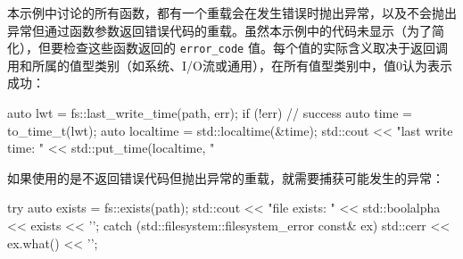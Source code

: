 本示例中讨论的所有函数，都有一个重载会在发生错误时抛出异常，以及不会抛出异常但通过函数参数返回错误代码的重载。虽然本示例中的代码未显示（为了简化），但要检查这些函数返回的 \verb|error_code| 值。每个值的实际含义取决于返回调用和所属的值型类别（如系统、I/O流或通用），在所有值型类别中，值0认为表示成功：

\begin{cpp}
auto lwt = fs::last_write_time(path, err);
if (!err) // success
{
    auto time = to_time_t(lwt);
    auto localtime = std::localtime(&time);
    std::cout << "last write time: "
              << std::put_time(localtime, "%
}
\end{cpp}

如果使用的是不返回错误代码但抛出异常的重载，就需要捕获可能发生的异常：

\begin{cpp}
try
{
    auto exists = fs::exists(path);
    std::cout << "file exists: " << std::boolalpha << exists << '\n';
}
catch (std::filesystem::filesystem_error const& ex)
{
    std::cerr << ex.what() << '\n';
}
\end{cpp}


